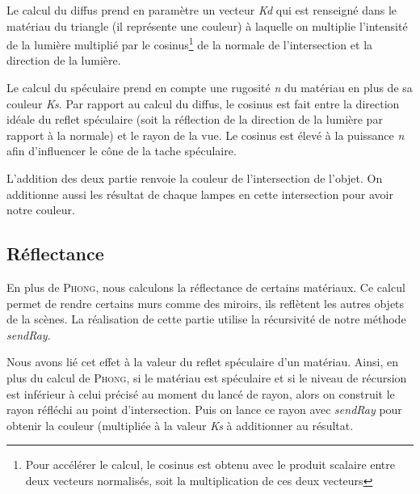 \documentclass{article}
\begin{document}
Le calcul du diffus prend en paramètre un
vecteur \textit{Kd} qui est renseigné dans le matériau du triangle (il représente une couleur) à laquelle on multiplie
l'intensité de la lumière multiplié par 
le cosinus\footnote{Pour accélérer le calcul, le cosinus est obtenu avec le produit scalaire entre deux vecteurs
normalisés, soit la multiplication de ces deux vecteurs} de la normale de l'intersection et la direction de la lumière. 

Le calcul du spéculaire prend en compte une rugosité \textit{n} du matériau en plus de sa couleur \textit{Ks}. Par rapport au calcul
du diffus, le cosinus est fait entre la direction idéale du reflet spéculaire (soit la réflection de la direction de la
lumière par rapport à la normale) et le rayon de la vue. Le cosinus est élevé à la
puissance \textit{n} afin d'influencer le cône de la tache spéculaire.

L'addition des deux partie renvoie la couleur de l'intersection de l'objet. On additionne aussi les résultat de chaque
lampes en cette intersection pour avoir notre couleur.

\subsection{Réflectance}

En plus de \textsc{Phong}, nous calculons la réflectance de certains matériaux. Ce calcul permet de rendre certains murs
comme des miroirs, ils reflètent les autres objets de la scènes. La réalisation de cette partie utilise la récursivité
de notre méthode \textit{sendRay}. 

Nous avons lié cet effet à la valeur du reflet spéculaire d'un matériau. Ainsi, en plus du calcul de \textsc{Phong}, si
le matériau est spéculaire et si le niveau de récursion est inférieur à celui précisé au moment du lancé de rayon, alors
on construit le rayon réfléchi au point d'intersection. Puis on lance ce rayon avec \textit{sendRay} pour obtenir la
couleur (multipliée à la valeur \textit{Ks} à additionner au résultat.
\end{document}

